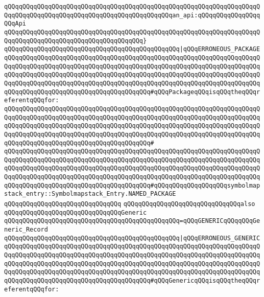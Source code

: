 \verb|qQQqqQQqqQQqqQQqqQQqqQQqqQQqqQQqqQQqqQQqqQQqqQQqqQQqqQQqqQQqqQQqqQQqqQQqqQQqqQQqqQQqqQQqqQQqqQQqqQQqqQQqqQQqqQQqqQQqan_api:qQQqqQQqqQQqqQQqqQQqApi|\newline
\verb|qQQqqQQqqQQqqQQqqQQqqQQqqQQqqQQqqQQqqQQqqQQqqQQqqQQqqQQqqQQqqQQqqQQqqQQqqQQqqQQqqQQqqQQqqQQqqQQqqQQqqQQqqQQq}|\newline
\verb|qQQqqQQqqQQqqQQqqQQqqQQqqQQqqQQqqQQqqQQqqQQqqQQq|\verb#|qQQqERRONEOUS_PACKAGE#\newline
\verb|qQQqqQQqqQQqqQQqqQQqqQQqqQQqqQQqqQQqqQQqqQQqqQQqqQQqqQQqqQQqqQQqqQQqqQQqqQQqqQQqqQQqqQQqqQQqqQQqqQQqqQQqqQQqqQQqqQQqqQQqqQQqqQQqqQQqqQQqqQQqqQQqqQQqqQQqqQQqqQQqqQQqqQQqqQQqqQQqqQQqqQQqqQQqqQQqqQQqqQQqqQQqqQQqqQQqqQQqqQQqqQQqqQQqqQQqqQQqqQQqqQQqqQQqqQQqqQQqqQQqqQQqqQQqqQQqqQQqqQQqqQQqqQQqqQQqqQQqqQQqqQQqqQQqqQQqqQQqqQQq#qQQqPackageqQQqisqQQqtheqQQqreferentqQQqfor:|\newline
\verb|qQQqqQQqqQQqqQQqqQQqqQQqqQQqqQQqqQQqqQQqqQQqqQQqqQQqqQQqqQQqqQQqqQQqqQQqqQQqqQQqqQQqqQQqqQQqqQQqqQQqqQQqqQQqqQQqqQQqqQQqqQQqqQQqqQQqqQQqqQQqqQQqqQQqqQQqqQQqqQQqqQQqqQQqqQQqqQQqqQQqqQQqqQQqqQQqqQQqqQQqqQQqqQQqqQQqqQQqqQQqqQQqqQQqqQQqqQQqqQQqqQQqqQQqqQQqqQQqqQQqqQQqqQQqqQQqqQQqqQQqqQQqqQQqqQQqqQQqqQQqqQQqqQQqqQQqqQQqqQQq#|\newline
\verb|qQQqqQQqqQQqqQQqqQQqqQQqqQQqqQQqqQQqqQQqqQQqqQQqqQQqqQQqqQQqqQQqqQQqqQQqqQQqqQQqqQQqqQQqqQQqqQQqqQQqqQQqqQQqqQQqqQQqqQQqqQQqqQQqqQQqqQQqqQQqqQQqqQQqqQQqqQQqqQQqqQQqqQQqqQQqqQQqqQQqqQQqqQQqqQQqqQQqqQQqqQQqqQQqqQQqqQQqqQQqqQQqqQQqqQQqqQQqqQQqqQQqqQQqqQQqqQQqqQQqqQQqqQQqqQQqqQQqqQQqqQQqqQQqqQQqqQQqqQQqqQQqqQQqqQQqqQQqqQQq#qQQqqQQqqQQqqQQqqQQqsymbolmapstack_entry::Symbolmapstack_Entry.NAMED_PACKAGE|\newline
\verb|qQQqqQQqqQQqqQQqqQQqqQQqqQQqqQQq|\newline
\newline
\verb|qQQqqQQqqQQqqQQqqQQqqQQqqQQqqQQqalso|\newline
\verb|qQQqqQQqqQQqqQQqqQQqqQQqqQQqqQQqGeneric|\newline
\verb|qQQqqQQqqQQqqQQqqQQqqQQqqQQqqQQqqQQqqQQqqQQqqQQq=qQQqGENERICqQQqqQQqGeneric_Record|\newline
\verb|qQQqqQQqqQQqqQQqqQQqqQQqqQQqqQQqqQQqqQQqqQQqqQQq|\verb#|qQQqERRONEOUS_GENERIC#\newline
\verb|qQQqqQQqqQQqqQQqqQQqqQQqqQQqqQQqqQQqqQQqqQQqqQQqqQQqqQQqqQQqqQQqqQQqqQQqqQQqqQQqqQQqqQQqqQQqqQQqqQQqqQQqqQQqqQQqqQQqqQQqqQQqqQQqqQQqqQQqqQQqqQQqqQQqqQQqqQQqqQQqqQQqqQQqqQQqqQQqqQQqqQQqqQQqqQQqqQQqqQQqqQQqqQQqqQQqqQQqqQQqqQQqqQQqqQQqqQQqqQQqqQQqqQQqqQQqqQQqqQQqqQQqqQQqqQQqqQQqqQQqqQQqqQQqqQQqqQQqqQQqqQQqqQQqqQQqqQQqqQQq#qQQqGenericqQQqisqQQqtheqQQqreferentqQQqfor:|\newline
